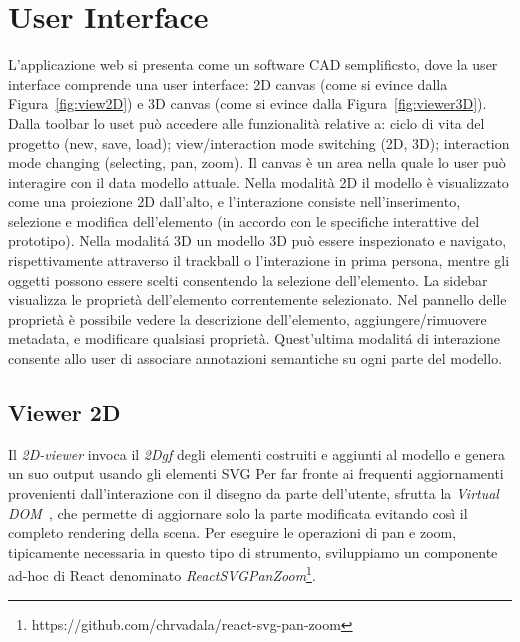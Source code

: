 \newpage
\section{User Interface}
\label{sec:chapter_2_section_4}

L'applicazione web si presenta come un software CAD semplificsto, dove la user interface comprende una user interface:
2D canvas (come si evince dalla Figura~\ref{fig:view2D}) e 3D canvas (come si evince dalla Figura~\ref{fig:viewer3D}).
Dalla toolbar lo uset pu\`o accedere alle funzionalit\`a relative a: ciclo di vita del progetto (new, save, load);
view/interaction mode switching (2D, 3D); interaction mode changing (selecting, pan, zoom).
Il canvas \`e un area nella quale lo user pu\`o interagire con il data modello attuale. Nella modalit\`a 2D
il modello \`e visualizzato come una proiezione 2D dall'alto, e l'interazione consiste nell'inserimento, selezione e modifica
dell'elemento (in accordo con le specifiche interattive del prototipo). Nella modalit\'a 3D un modello 3D pu\`o essere
inspezionato e navigato, rispettivamente attraverso il trackball o l'interazione in prima persona, mentre gli oggetti
possono essere scelti consentendo la selezione dell'elemento.
La sidebar visualizza le propriet\`a dell'elemento correntemente selezionato. Nel pannello delle propriet\`a \`e possibile
vedere la descrizione dell'elemento, aggiungere/rimuovere metadata, e modificare qualsiasi propriet\`a.
Quest'ultima modalit\'a di interazione consente allo user di associare annotazioni semantiche su ogni parte del modello.
\newpage

\subsection{Viewer 2D}
Il \emph{2D-viewer} invoca il  \emph{2Dgf} degli elementi costruiti e aggiunti al modello e genera un suo output usando gli elementi SVG
Per far fronte ai frequenti aggiornamenti provenienti dall'interazione con il disegno da parte dell'utente,
sfrutta la \emph{Virtual DOM}~\cite{vdom}, che permette di aggiornare solo la parte modificata evitando così
il completo rendering della scena. Per eseguire le operazioni di pan e zoom, tipicamente necessaria in questo
tipo di strumento, sviluppiamo un componente ad-hoc di React denominato \emph{ReactSVGPanZoom}\footnote{https://github.com/chrvadala/react-svg-pan-zoom}.\\


